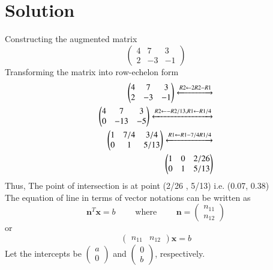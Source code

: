 \documentclass[journal,12pt,twocolumn]{IEEEtran}
\begin{document}
\section{Solution}
\begin{flushleft}
Constructing the augmented matrix \\
$$
\begin{pmatrix}
    4 & 7 & 3 \\ 
    2 & -3 & -1
\end{pmatrix}
$$
Transforming the matrix into row-echelon form \\
\begin{align}
\begin{pmatrix}
4 & 7 & 3 \\
2 & -3 & -1
\end{pmatrix}
  \xleftrightarrow[]{R2 \leftarrow 2R2 - R1 } \nonumber \\
\begin{pmatrix}
4 & 7 & 3 \\
0 & -13 & -5
\end{pmatrix}
\xleftrightarrow[]{R2 \leftarrow -R2/13,R1 \leftarrow R1/4} \nonumber \\
\begin{pmatrix}
1 & 7/4 & 3/4 \\
0 & 1 & 5/13
\end{pmatrix}
\xleftrightarrow[]{R1 \leftarrow R1-7/4R1/4} \nonumber \\
\begin{pmatrix}
1 & 0 & 2/26 \\
0 & 1 & 5/13
\end{pmatrix}
\end{align}
Thus, The point of intersection is at point (2/26 , 5/13) i.e. (0.07, 0.38)\\


The equation of line in terms of vector notations can be written as
\begin{equation}
	{\mathbf{n}^T}{\mathbf x} = b 
	\qquad \text{ where } \qquad 
	\mathbf{n} = 
\begin{pmatrix}
	n_{11} \\ 
	n_{12}
\end{pmatrix}
\end{equation}
	or
\begin{equation}
\begin{pmatrix}
	n_{11} & n_{12}
\end{pmatrix}
	{\mathbf{x}} = b	\label{eq2}
\end{equation}
Let the intercepts be 
$\displaystyle
\begin{pmatrix}
	a \\ 0
\end{pmatrix}$
and 
$\displaystyle
\begin{pmatrix}
	0 \\ b
\end{pmatrix}$, respectively. \\


\end{flushleft}
\end{document}
